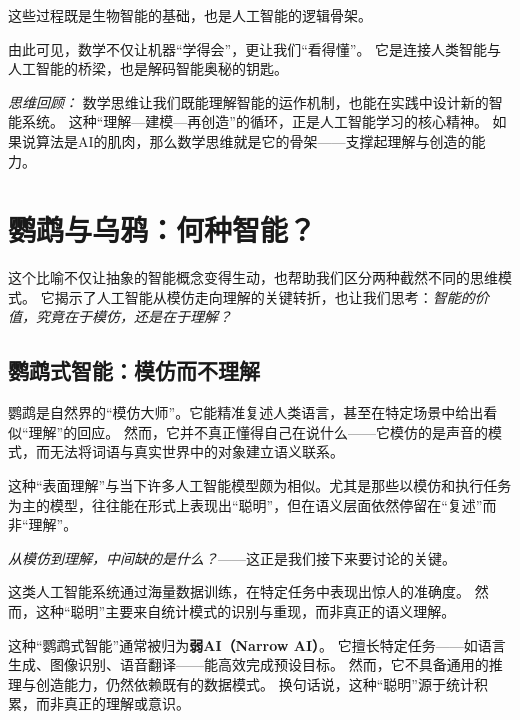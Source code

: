 这些过程既是生物智能的基础，也是人工智能的逻辑骨架。

由此可见，数学不仅让机器“学得会”，更让我们“看得懂”。  
它是连接人类智能与人工智能的桥梁，也是解码智能奥秘的钥匙。  

\noindent\textit{思维回顾：} 数学思维让我们既能理解智能的运作机制，也能在实践中设计新的智能系统。  
这种“理解—建模—再创造”的循环，正是人工智能学习的核心精神。  
如果说算法是AI的肌肉，那么数学思维就是它的骨架——支撑起理解与创造的能力。

\section{鹦鹉与乌鸦：何种智能？}

这个比喻不仅让抽象的智能概念变得生动，也帮助我们区分两种截然不同的思维模式。  
它揭示了人工智能从模仿走向理解的关键转折，也让我们思考：\emph{智能的价值，究竟在于模仿，还是在于理解？}

\subsection{鹦鹉式智能：模仿而不理解}

鹦鹉是自然界的“模仿大师”。它能精准复述人类语言，甚至在特定场景中给出看似“理解”的回应。  
然而，它并不真正懂得自己在说什么——它模仿的是声音的模式，而无法将词语与真实世界中的对象建立语义联系。  
  
这种“表面理解”与当下许多人工智能模型颇为相似。尤其是那些以模仿和执行任务为主的模型，往往能在形式上表现出“聪明”，但在语义层面依然停留在“复述”而非“理解”。  

\emph{从模仿到理解，中间缺的是什么？}——这正是我们接下来要讨论的关键。

这类人工智能系统通过海量数据训练，在特定任务中表现出惊人的准确度。  
然而，这种“聪明”主要来自统计模式的识别与重现，而非真正的语义理解。  
  
这种“鹦鹉式智能”通常被归为\textbf{弱AI（Narrow AI）}。  
它擅长特定任务——如语言生成、图像识别、语音翻译——能高效完成预设目标。  
然而，它不具备通用的推理与创造能力，仍然依赖既有的数据模式。  
换句话说，这种“聪明”源于统计积累，而非真正的理解或意识。  

